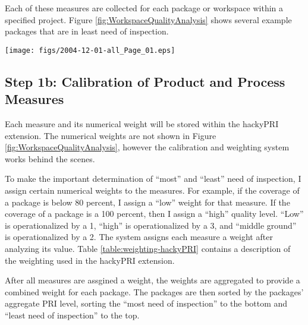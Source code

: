 Each of these measures are collected for each package or workspace within a
specified project. Figure \ref{fig:WorkspaceQualityAnalysis} shows several
example packages that are in least need of inspection.

\begin{figure*}[ht]
  \centering
  \texttt{[image: figs/2004-12-01-all\_Page\_01.eps]}
  \caption{The Workspace PRI analysis. Workspaces are listed with its
  respective PRI determination and the measures.
}
  \label{fig:WorkspaceQualityAnalysis}
\end{figure*}


\subsection{Step 1b: Calibration of Product and Process Measures}
Each measure and its numerical weight will be stored within the hackyPRI
extension. The numerical weights are not shown in Figure
\ref{fig:WorkspaceQualityAnalysis}, however the calibration and weighting
system works behind the scenes. 

To make the important determination of ``most'' and ``least'' need of
inspection, I assign certain numerical weights to the measures. For
example, if the coverage of a package is below 80 percent, I assign a
``low'' weight for that measure. If the coverage of a package is a 100
percent, then I assign a ``high'' quality level. ``Low'' is operationalized
by a 1, ``high'' is operationalized by a 3, and ``middle ground'' is
operationalized by a 2. The system assigns each measure a weight after
analyzing its value. Table \ref{table:weighting-hackyPRI} contains a
description of the weighting used in the hackyPRI extension.

After all measures are assgined a weight, the weights are aggregated to
provide a combined weight for each package. The packages are then sorted by
the packages' aggregate PRI level, sorting the ``most need of inspection''
to the bottom and ``least need of inspection'' to the top.

